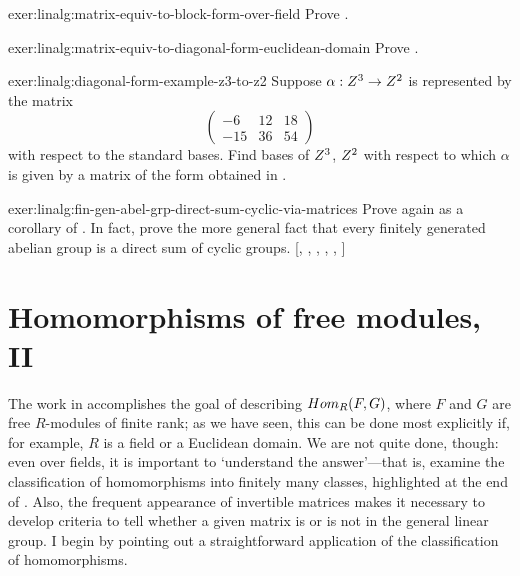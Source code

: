 \begin{exer}{}{exer:linalg:matrix-equiv-to-block-form-over-field}
  Prove .
\end{exer}
\begin{exer}{}{exer:linalg:matrix-equiv-to-diagonal-form-euclidean-domain}
  Prove .
\end{exer}
\begin{exer}{}{exer:linalg:diagonal-form-example-z3-to-z2}
  Suppose $\alpha : Z^3 \to Z^2$ is represented by the matrix
  \[
    \begin{pmatrix} -6 & 12 & 18 \\ -15 & 36 & 54 \end{pmatrix}
  \]
  with respect to the standard bases. Find bases of $Z^3$, $Z^2$
  with respect to which $\alpha$ is given by a matrix of the form
  obtained in .
\end{exer}
\begin{exer}{\exerused}{exer:linalg:fin-gen-abel-grp-direct-sum-cyclic-via-matrices}
  Prove  again as a corollary of
  . In fact, prove the more general fact that every
  finitely generated abelian group is a direct sum of cyclic groups.
  [,
  ,
  ,
  ,
  ,
  ]
\end{exer}

\section{Homomorphisms of free modules, II}
\label{sec:linalg:homomorphisms-of-free-modules-ii}


The work in 
accomplishes the goal of describing $Hom_R(F,G)$, where $F$ and $G$
are free $R$-modules of finite rank; as we have seen, this can be done
most explicitly if, for example, $R$ is a field or a Euclidean
domain. We are not quite done, though: even over fields, it is
important to `understand the answer'---that is, examine the
classification of homomorphisms into finitely many classes,
highlighted at the end of
. Also,
the frequent appearance of invertible matrices makes it necessary to
develop criteria to tell whether a given matrix is or is not in the
general linear group. I begin by pointing out a straightforward
application of the classification of homomorphisms.

